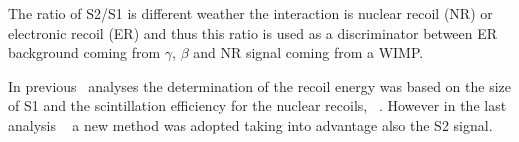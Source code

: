 The ratio of S2/S1 is different weather the interaction is nuclear recoil (NR) or electronic recoil (ER) and thus this ratio is used as a discriminator between ER background coming from $\gamma$, $\beta$ and NR signal coming from a WIMP. 

In previous \Xehund\ analyses the determination of the recoil energy was based on the size of S1 and the scintillation efficiency for the nuclear recoils, \Leff ~\cite{xe100_run10_si}. However in the last analysis ~\cite{xe100_run_combination} a new method was adopted taking into advantage also the S2 signal.
      

